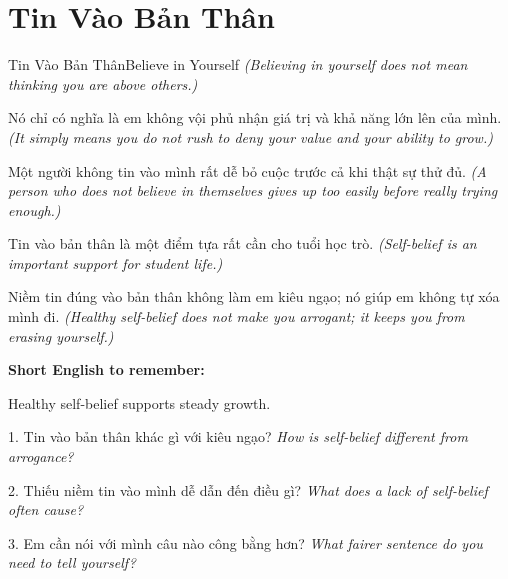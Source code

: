 \section{Tin Vào Bản Thân}
\begin{truyen}{Tin Vào Bản Thân}{Believe in Yourself}
\textit{(Believing in yourself does not mean thinking you are above others.)}

Nó chỉ có nghĩa là em không vội phủ nhận giá trị và khả năng lớn lên của mình.
\textit{(It simply means you do not rush to deny your value and your ability to grow.)}

Một người không tin vào mình rất dễ bỏ cuộc trước cả khi thật sự thử đủ.
\textit{(A person who does not believe in themselves gives up too easily before really trying enough.)}

Tin vào bản thân là một điểm tựa rất cần cho tuổi học trò.
\textit{(Self-belief is an important support for student life.)}
\end{truyen}

\begin{baihoc}
Niềm tin đúng vào bản thân không làm em kiêu ngạo; nó giúp em không tự xóa mình đi.
\textit{(Healthy self-belief does not make you arrogant; it keeps you from erasing yourself.)}
\end{baihoc}

\begin{ghinhoanh}
\textbf{Short English to remember:}

Healthy self-belief supports steady growth.

\end{ghinhoanh}

\begin{tuhocnhanh}
1. Tin vào bản thân khác gì với kiêu ngạo? \textit{How is self-belief different from arrogance?}

2. Thiếu niềm tin vào mình dễ dẫn đến điều gì? \textit{What does a lack of self-belief often cause?}

3. Em cần nói với mình câu nào công bằng hơn? \textit{What fairer sentence do you need to tell yourself?}
\end{tuhocnhanh}
\ngancach